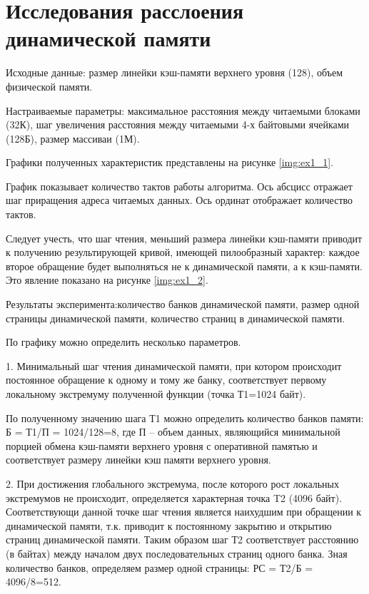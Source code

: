 
\chapter*{Исследования расслоения динамической памяти}

Исходные данные: размер линейки кэш-памяти верхнего уровня (128), объем физической памяти.


Настраиваемые параметры: максимальное расстояния между  читаемыми блоками (32К), шаг увеличения расстояния между  читаемыми 4-х байтовыми ячейками (128Б), размер массиваи (1М).

Графики полученных характеристик представлены на рисунке \ref{img:ex1_1}.



График показывает количество тактов работы алгоритма. Ось абсцисс отражает шаг приращения адреса читаемых данных. Ось ординат отображает количество тактов.

Следует учесть, что шаг чтения, меньший размера линейки кэш-памяти приводит к получению результирующей кривой, имеющей пилообразный характер: каждое второе обращение будет выполняться не к динамической памяти, а к кэш-памяти. Это явление показано на рисунке \ref{img:ex1_2}.

\clearpage
{}


Результаты эксперимента:количество банков динамической памяти, размер одной страницы динамической памяти, количество страниц в динамической памяти.

По графику можно определить несколько параметров.

1. Минимальный шаг чтения динамической памяти, при котором происходит постоянное обращение к одному и тому же банку, соответствует первому локальному экстремуму полученной функции (точка Т1=1024 байт).

По полученному значению шага Т1 можно определить количество банков памяти: Б = Т1/П = 1024/128=8, где П – объем данных, являющийся минимальной порцией обмена кэш-памяти верхнего уровня с оперативной памятью и соответствует размеру линейки кэшпамяти верхнего уровня.

2. При достижения глобального экстремума, после которого рост локальных экстремумов не происходит, определяется характерная точка T2 (4096 байт). Соответствующи данной точке шаг чтения является наихудшим при обращении к динамической памяти, т.к. приводит к постоянному закрытию и открытию страниц динамической памяти. Таким образом шаг Т2 соответствует расстоянию (в байтах) между началом двух последовательных страниц одного банка. Зная количество банков, определяем размер одной страницы: РС = Т2/Б = 4096/8=512.

